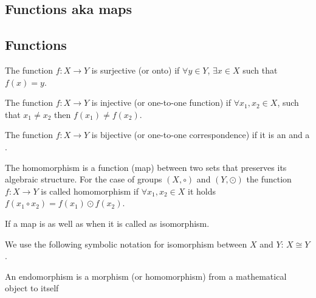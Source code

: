\begin{appendices}
\section{Functions aka maps}

\subsection{Functions}

\begin{definition}[Surjection]
  The function $f: X \rightarrow Y$ is surjective (or onto) if
  $\forall y \in Y$, $\exists x \in X$ such that
  $f\left(x\right) = y$.
  \label{def:surjection}
\end{definition}

\begin{definition}[Injection]
  The function $f: X \rightarrow Y$ is injective (or one-to-one function) if
  $\forall x_1, x_2 \in X$, such that $x_1 \ne x_2$ then
  $f\left(x_1\right) \ne f\left(x_2\right)$.
  \label{def:injection}
\end{definition}

\begin{definition}[Bijection]
  The function $f: X \rightarrow Y$ is bijective (or one-to-one
  correspondence) if it is an  and a
  . 
  \label{def:bijection}
\end{definition}

\begin{definition}[Homomorphism]
  The homomorphism is a function (map) between two sets that preserves
  its algebraic structure. For the case of groups
  $\left(X, \circ\right)$ and $\left(Y, \odot\right)$ the function
  $f: X \rightarrow Y$ is called homomorphism if
  $\forall x_1, x_2 \in X$ it holds
  $f\left(x_1 \circ x_2\right) = f\left(x_1 \right) \odot f\left( x_2\right)$.
  \label{def:homomorphism}
\end{definition}

\begin{definition}[Isomorphism]
  If a map is  as well as
   when it is called as isomorphism.

  We use the following symbolic notation for isomorphism between $X$
  and $Y$: $X \cong Y$.
  \label{def:isomorphism}
\end{definition}

\begin{definition}[Endomorphism]
   An endomorphism is a morphism (or homomorphism) from a mathematical
   object to itself \cite{wiki:endomorphism}
   \label{def:endomorphism}
\end{definition}


\end{appendices}
